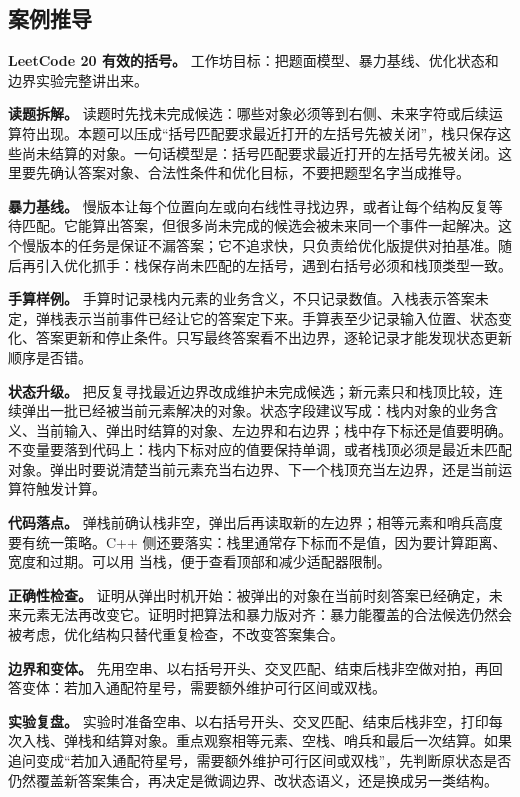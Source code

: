 \subsection{案例推导}

\noindent\textbf{LeetCode 20 有效的括号。} 工作坊目标：把题面模型、暴力基线、优化状态和边界实验完整讲出来。

\textbf{读题拆解。} 读题时先找未完成候选：哪些对象必须等到右侧、未来字符或后续运算符出现。本题可以压成“括号匹配要求最近打开的左括号先被关闭”，栈只保存这些尚未结算的对象。一句话模型是：括号匹配要求最近打开的左括号先被关闭。这里要先确认答案对象、合法性条件和优化目标，不要把题型名字当成推导。

\textbf{暴力基线。} 慢版本让每个位置向左或向右线性寻找边界，或者让每个结构反复等待匹配。它能算出答案，但很多尚未完成的候选会被未来同一个事件一起解决。这个慢版本的任务是保证不漏答案；它不追求快，只负责给优化版提供对拍基准。随后再引入优化抓手：栈保存尚未匹配的左括号，遇到右括号必须和栈顶类型一致。

\textbf{手算样例。} 手算时记录栈内元素的业务含义，不只记录数值。入栈表示答案未定，弹栈表示当前事件已经让它的答案定下来。手算表至少记录输入位置、状态变化、答案更新和停止条件。只写最终答案看不出边界，逐轮记录才能发现状态更新顺序是否错。

\textbf{状态升级。} 把反复寻找最近边界改成维护未完成候选；新元素只和栈顶比较，连续弹出一批已经被当前元素解决的对象。状态字段建议写成：栈内对象的业务含义、当前输入、弹出时结算的对象、左边界和右边界；栈中存下标还是值要明确。不变量要落到代码上：栈内下标对应的值要保持单调，或者栈顶必须是最近未匹配对象。弹出时要说清楚当前元素充当右边界、下一个栈顶充当左边界，还是当前运算符触发计算。

\textbf{代码落点。} 弹栈前确认栈非空，弹出后再读取新的左边界；相等元素和哨兵高度要有统一策略。C++ 侧还要落实：栈里通常存下标而不是值，因为要计算距离、宽度和过期。可以用  当栈，便于查看顶部和减少适配器限制。

\textbf{正确性检查。} 证明从弹出时机开始：被弹出的对象在当前时刻答案已经确定，未来元素无法再改变它。证明时把算法和暴力版对齐：暴力能覆盖的合法候选仍然会被考虑，优化结构只替代重复检查，不改变答案集合。

\textbf{边界和变体。} 先用空串、以右括号开头、交叉匹配、结束后栈非空做对拍，再回答变体：若加入通配符星号，需要额外维护可行区间或双栈。

\textbf{实验复盘。} 实验时准备空串、以右括号开头、交叉匹配、结束后栈非空，打印每次入栈、弹栈和结算对象。重点观察相等元素、空栈、哨兵和最后一次结算。如果追问变成“若加入通配符星号，需要额外维护可行区间或双栈”，先判断原状态是否仍然覆盖新答案集合，再决定是微调边界、改状态语义，还是换成另一类结构。

